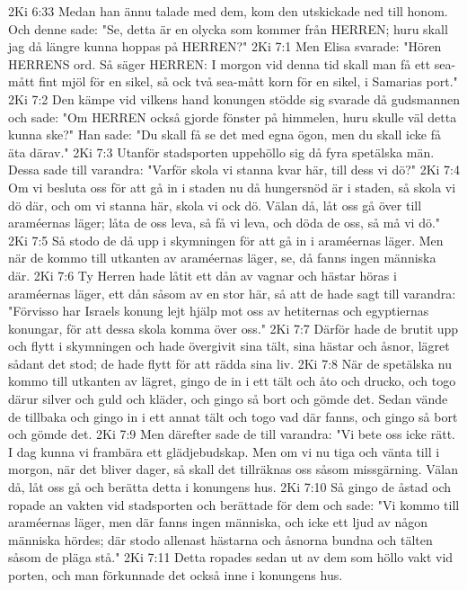 2Ki 6:33  Medan han ännu talade med dem, kom den utskickade ned till honom. Och denne sade: "Se, detta är en olycka som kommer från HERREN; huru skall jag då längre kunna hoppas på HERREN?"
2Ki 7:1  Men Elisa svarade: "Hören HERRENS ord. Så säger HERREN: I morgon vid denna tid skall man få ett sea-mått fint mjöl för en sikel, så ock två sea-mått korn för en sikel, i Samarias port."
2Ki 7:2  Den kämpe vid vilkens hand konungen stödde sig svarade då gudsmannen och sade: "Om HERREN också gjorde fönster på himmelen, huru skulle väl detta kunna ske?" Han sade: "Du skall få se det med egna ögon, men du skall icke få äta därav."
2Ki 7:3  Utanför stadsporten uppehöllo sig då fyra spetälska män. Dessa sade till varandra: "Varför skola vi stanna kvar här, till dess vi dö?"
2Ki 7:4  Om vi besluta oss för att gå in i staden nu då hungersnöd är i staden, så skola vi dö där, och om vi stanna här, skola vi ock dö. Välan då, låt oss gå över till araméernas läger; låta de oss leva, så få vi leva, och döda de oss, så må vi dö."
2Ki 7:5  Så stodo de då upp i skymningen för att gå in i araméernas läger. Men när de kommo till utkanten av araméernas läger, se, då fanns ingen människa där.
2Ki 7:6  Ty Herren hade låtit ett dån av vagnar och hästar höras i araméernas läger, ett dån såsom av en stor här, så att de hade sagt till varandra: "Förvisso har Israels konung lejt hjälp mot oss av hetiternas och egyptiernas konungar, för att dessa skola komma över oss."
2Ki 7:7  Därför hade de brutit upp och flytt i skymningen och hade övergivit sina tält, sina hästar och åsnor, lägret sådant det stod; de hade flytt för att rädda sina liv.
2Ki 7:8  När de spetälska nu kommo till utkanten av lägret, gingo de in i ett tält och åto och drucko, och togo därur silver och guld och kläder, och gingo så bort och gömde det. Sedan vände de tillbaka och gingo in i ett annat tält och togo vad där fanns, och gingo så bort och gömde det.
2Ki 7:9  Men därefter sade de till varandra: "Vi bete oss icke rätt. I dag kunna vi frambära ett glädjebudskap. Men om vi nu tiga och vänta till i morgon, när det bliver dager, så skall det tillräknas oss såsom missgärning. Välan då, låt oss gå och berätta detta i konungens hus.
2Ki 7:10  Så gingo de åstad och ropade an vakten vid stadsporten och berättade för dem och sade: "Vi kommo till araméernas läger, men där fanns ingen människa, och icke ett ljud av någon människa hördes; där stodo allenast hästarna och åsnorna bundna och tälten såsom de pläga stå."
2Ki 7:11  Detta ropades sedan ut av dem som höllo vakt vid porten, och man förkunnade det också inne i konungens hus.
